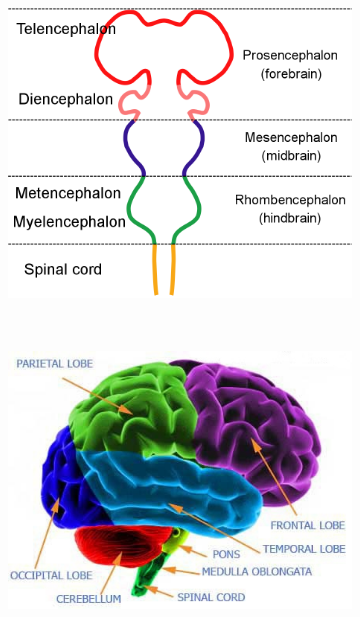 \documentclass[english,11pt]{article}
\begin{document}
\begin{figure}[H]
        \centering
        \begin{subfigure}[b]{0.5\textwidth}
                \centering
\includegraphics[width=\textwidth]{brain-parts.png}
        \end{subfigure}%
        ~
        \begin{subfigure}[b]{0.5\textwidth}
                \centering
\includegraphics[width=\textwidth]{brain.png}
        \end{subfigure}
\end{figure}
\end{document}
